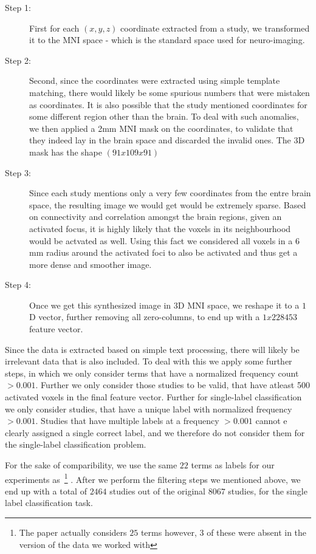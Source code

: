 \documentclass{article} %
\begin{document}
\begin{description}
\item[Step 1: ] First for each $(x, y, z)$ coordinate extracted from a study, we transformed it to the MNI space - which is the standard space used for neuro-imaging. 
\item[Step 2: ] Second, since the coordinates were extracted using simple template matching, there would likely be some spurious numbers that were mistaken as coordinates. It is also possible that the study mentioned coordinates for some different region other than the brain. To deal with such anomalies, we then applied a 2mm MNI mask on the coordinates, to validate that they indeed lay in the brain space and discarded the invalid ones. The 3D mask has the shape $(91 x 109 x 91)$ 
\item[Step 3: ] Since each study mentions only a very few coordinates from the entre brain space, the resulting image we would get would be extremely sparse. Based on connectivity and correlation amongst the brain regions, given an activated focus, it is highly likely that the voxels in its neighbourhood would be actvated as well. Using this fact we considered all voxels in a $6$ mm radius around the activated foci to also be activated and thus get a more dense and smoother image.
\item[Step 4: ] Once we get this synthesized image in $3$D MNI space, we reshape it to a $1$D vector, further removing all zero-columns, to end up with a $1 x 228453$ feature vector.  
\end{description}

Since the data is extracted based on simple text processing, there will likely be irrelevant data that is also included. To deal with this we apply some further steps, in which we only consider terms that have a normalized frequency count $ > 0.001$. Further we only consider those studies to be valid, that have atleast 500 activated voxels in the final feature vector. Further for single-label classification we only consider studies, that have a unique label with normalized frequency  $ > 0.001$. Studies that have multiple labels at a frequency $ > 0.001$ cannot e clearly assigned a single correct label, and we therefore do not consider them for the single-label classification problem.

For the sake of comparibility, we use the same $22$ terms as labels for our experiments as~\cite{yarkoni2011large}\footnote{The paper actually considers $25$ terms however, $3$ of these were absent in the version of the data we worked with} . After we perform the filtering steps we mentioned above, we end up with a total of $2464$ studies out of the original $8067$ studies, for the single label classification task.
\end{document}
